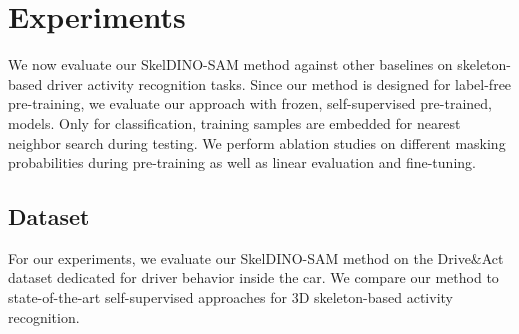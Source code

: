 \section{Experiments}
We now evaluate our SkelDINO-SAM method against other baselines on skeleton-based driver activity recognition tasks. Since our method is designed for label-free pre-training, we evaluate our approach with frozen, self-supervised pre-trained, models. Only for classification, training samples are embedded for nearest neighbor search during testing. We perform ablation studies on different masking probabilities during pre-training as well as linear evaluation and fine-tuning.
\subsection{Dataset}
For our experiments, we evaluate our SkelDINO-SAM method on 
the Drive\&Act \cite{drive_and_act_2019_iccv} dataset dedicated for driver behavior inside the car. We compare our method to state-of-the-art self-supervised approaches for 3D skeleton-based activity recognition.


